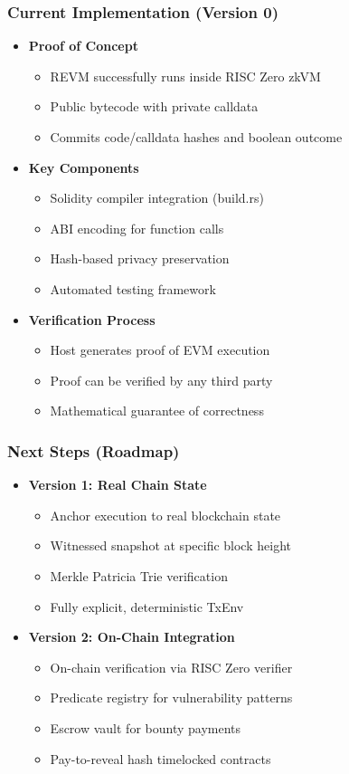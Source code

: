 \documentclass{beamer}
\begin{document}
\begin{frame}
\frametitle{Current Implementation (Version 0)}
\begin{itemize}
    \item \textbf{Proof of Concept}
        \begin{itemize}
            \item REVM successfully runs inside RISC Zero zkVM
            \item Public bytecode with private calldata
            \item Commits code/calldata hashes and boolean outcome
        \end{itemize}
    \item \textbf{Key Components}
        \begin{itemize}
            \item Solidity compiler integration (build.rs)
            \item ABI encoding for function calls
            \item Hash-based privacy preservation
            \item Automated testing framework
        \end{itemize}
    \item \textbf{Verification Process}
        \begin{itemize}
            \item Host generates proof of EVM execution
            \item Proof can be verified by any third party
            \item Mathematical guarantee of correctness
        \end{itemize}
\end{itemize}
\end{frame}

\begin{frame}
\frametitle{Next Steps (Roadmap)}
\begin{itemize}
    \item \textbf{Version 1: Real Chain State}
        \begin{itemize}
            \item Anchor execution to real blockchain state
            \item Witnessed snapshot at specific block height
            \item Merkle Patricia Trie verification
            \item Fully explicit, deterministic TxEnv
        \end{itemize}
    \item \textbf{Version 2: On-Chain Integration}
        \begin{itemize}
            \item On-chain verification via RISC Zero verifier
            \item Predicate registry for vulnerability patterns
            \item Escrow vault for bounty payments
            \item Pay-to-reveal hash timelocked contracts
        \end{itemize}
\end{itemize}
\end{frame}
\end{document}
